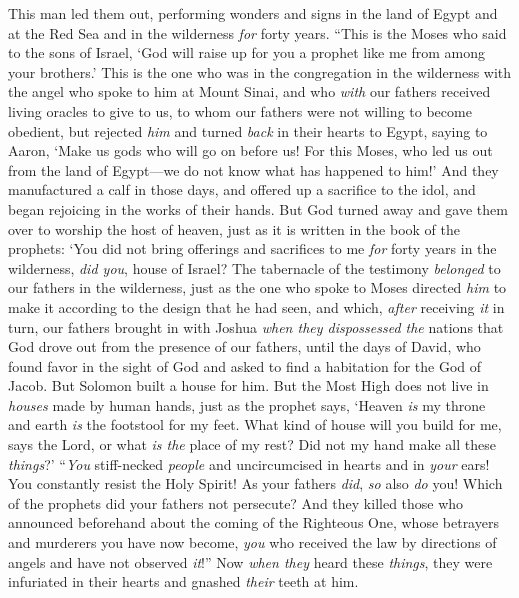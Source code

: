 \begin{biblechapter}
\verse This man led them out, performing wonders and signs in the land of Egypt and at the Red Sea and in the wilderness \textit{for} forty years.
\verse “This is the Moses who said to the sons of Israel, ‘God will raise up for you a prophet like me from among your brothers.’
\verse This is the one who was in the congregation in the wilderness with the angel who spoke to him at Mount Sinai, and who \textit{with} our fathers received living oracles to give to us,
\verse to whom our fathers were not willing to become obedient, but rejected \textit{him} and turned \textit{back} in their hearts to Egypt,
\verse saying to Aaron, ‘Make us gods who will go on before us! For this Moses, who led us out from the land of Egypt—we do not know what has happened to him!’
\verse And they manufactured a calf in those days, and offered up a sacrifice to the idol, and began rejoicing in the works of their hands.
\verse But God turned away and gave them over to worship the host of heaven, just as it is written in the book of the prophets:
\verse ‘You did not bring offerings and sacrifices to me 
\textit{for} forty years in the wilderness, \textit{did you}, house of Israel?
\verse The tabernacle of the testimony \textit{belonged} to our fathers in the wilderness, just as the one who spoke to Moses directed \textit{him} to make it according to the design that he had seen,
\verse and which, \textit{after} receiving \textit{it} in turn, our fathers brought in with Joshua \textit{when they dispossessed the} nations that God drove out from the presence of our fathers, until the days of David,
\verse who found favor in the sight of God and asked to find a habitation for the God of Jacob.
\verse But Solomon built a house for him.
\verse But the Most High does not live in \textit{houses} made by human hands, just as the prophet says,
\verse ‘Heaven \textit{is} my throne 
and earth \textit{is} the footstool for my feet. 
What kind of house will you build for me, says the Lord, 
or what \textit{is the} place of my rest?
\verse Did not my hand make all these \textit{things}?’
\verse “\textit{You} stiff-necked \textit{people} and uncircumcised in hearts and in \textit{your} ears! You constantly resist the Holy Spirit! As your fathers \textit{did}, \textit{so} also \textit{do} you!
\verse Which of the prophets did your fathers not persecute? And they killed those who announced beforehand about the coming of the Righteous One, whose betrayers and murderers you have now become,
\verse \textit{you} who received the law by directions of angels and have not observed \textit{it}!”
 Now \textit{when they} heard these \textit{things}, they were infuriated in their hearts and gnashed \textit{their} teeth at him.

\end{biblechapter}
